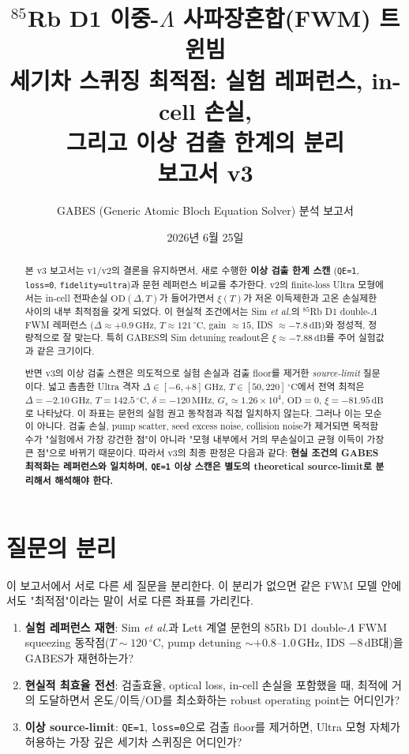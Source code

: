 \documentclass[11pt,a4paper]{article}
\title{\textbf{$^{85}$Rb D1 이중-$\Lambda$ 사파장혼합(FWM) 트윈빔\\
세기차 스퀴징 최적점: 실험 레퍼런스, in-cell 손실,\\
그리고 이상 검출 한계의 분리}\\[4pt]
\large 보고서 v3}
\author{GABES (Generic Atomic Bloch Equation Solver) 분석 보고서}
\date{2026년 6월 25일}
\newcommand{\dB}{\,\mathrm{dB}}
\newcommand{\GHz}{\,\mathrm{GHz}}
\newcommand{\MHz}{\,\mathrm{MHz}}
\newcommand{\degC}{\,^{\circ}\mathrm{C}}
\begin{document}
\maketitle

\begin{abstract}
\noindent
본 v3 보고서는 v1/v2의 결론을 유지하면서, 새로 수행한 \textbf{이상 검출 한계 스캔}
(\texttt{QE=1}, \texttt{loss=0}, \texttt{fidelity=ultra})과 문헌 레퍼런스 비교를 추가한다.
v2의 finite-loss Ultra 모형에서는 in-cell 전파손실 $\mathrm{OD}(\Delta,T)$가 들어가면서
$\xi(T)$가 저온 이득제한과 고온 손실제한 사이의 내부 최적점을 갖게 되었다. 이 현실적
조건에서는 Sim \textit{et al.}의 $^{85}$Rb D1 double-$\Lambda$ FWM 레퍼런스
($\Delta\approx+0.9\GHz$, $T\approx121\degC$, gain $\approx15$, IDS $\approx-7.8\dB$)와
정성적, 정량적으로 잘 맞는다. 특히 GABES의 Sim detuning readout은 $\xi\approx-7.88\dB$를
주어 실험값과 같은 크기이다.

반면 v3의 이상 검출 스캔은 의도적으로 실험 손실과 검출 floor를 제거한 \emph{source-limit}
질문이다. 넓고 촘촘한 Ultra 격자
$\Delta\in[-6,+8]\GHz$, $T\in[50,220]\degC$에서 전역 최적은
$\Delta=-2.10\GHz$, $T=142.5\degC$, $\delta=-120\MHz$,
$G_s\simeq1.26\times10^4$, $\mathrm{OD}=0$, $\xi=-81.95\dB$로 나타났다.
이 좌표는 문헌의 실험 권고 동작점과 직접 일치하지 않는다. 그러나 이는 모순이 아니다.
검출 손실, pump scatter, seed excess noise, collision noise가 제거되면 목적함수가
"실험에서 가장 강건한 점"이 아니라 "모형 내부에서 거의 무손실이고 균형 이득이 가장 큰 점"으로
바뀌기 때문이다. 따라서 v3의 최종 판정은 다음과 같다:
\textbf{현실 조건의 GABES 최적화는 레퍼런스와 일치하며, \texttt{QE=1} 이상 스캔은 별도의
theoretical source-limit로 분리해서 해석해야 한다.}
\end{abstract}

\tableofcontents
\bigskip

\section{질문의 분리}
이 보고서에서 서로 다른 세 질문을 분리한다. 이 분리가 없으면 같은 FWM 모델 안에서도
"최적점"이라는 말이 서로 다른 좌표를 가리킨다.

\begin{enumerate}[nosep]
\item \textbf{실험 레퍼런스 재현}: Sim \textit{et al.}과 Lett 계열 문헌의 85Rb D1
      double-$\Lambda$ FWM squeezing 동작점($T\sim120\degC$, pump detuning
      $\sim+0.8\text{--}1.0\GHz$, IDS $-8\dB$대)을 GABES가 재현하는가?
\item \textbf{현실적 최효율 전선}: 검출효율, optical loss, in-cell 손실을 포함했을 때,
      최적에 거의 도달하면서 온도/이득/OD를 최소화하는 robust operating point는 어디인가?
\item \textbf{이상 source-limit}: \texttt{QE=1}, \texttt{loss=0}으로 검출 floor를 제거하면,
      Ultra 모형 자체가 허용하는 가장 깊은 세기차 스퀴징은 어디인가?
\end{enumerate}
\end{document}
